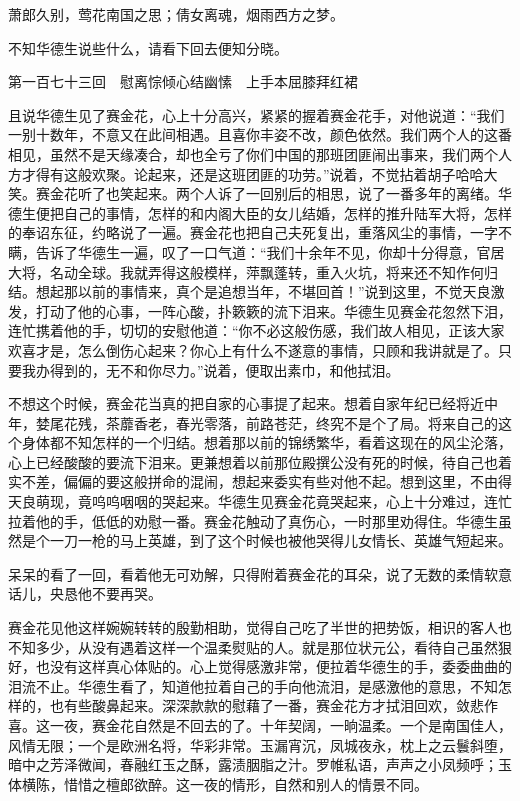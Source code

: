 \documentclass[12pt,UTF8]{ctexbook}
\begin{document}
{{{萧郎久别，莺花南国之思；倩女离魂，烟雨西方之梦。

不知华德生说些什么，请看下回去便知分晓。





第一百七十三回　慰离悰倾心结幽愫　上手本屈膝拜红裙





且说华德生见了赛金花，心上十分高兴，紧紧的握着赛金花手，对他说道：“我们一别十数年，不意又在此间相遇。且喜你丰姿不改，颜色依然。我们两个人的这番相见，虽然不是天缘凑合，却也全亏了你们中国的那班团匪闹出事来，我们两个人方才得有这般欢聚。论起来，还是这班团匪的功劳。”说着，不觉拈着胡子哈哈大笑。赛金花听了也笑起来。两个人诉了一回别后的相思，说了一番多年的离绪。华德生便把自己的事情，怎样的和内阁大臣的女儿结婚，怎样的推升陆军大将，怎样的奉诏东征，约略说了一遍。赛金花也把自己夫死复出，重落风尘的事情，一字不瞒，告诉了华德生一遍，叹了一口气道：“我们十余年不见，你却十分得意，官居大将，名动全球。我就弄得这般模样，萍飘蓬转，重入火坑，将来还不知作何归结。想起那以前的事情来，真个是追想当年，不堪回首！”说到这里，不觉天良激发，打动了他的心事，一阵心酸，扑簌簌的流下泪来。华德生见赛金花忽然下泪，连忙携着他的手，切切的安慰他道：“你不必这般伤感，我们故人相见，正该大家欢喜才是，怎么倒伤心起来？你心上有什么不遂意的事情，只顾和我讲就是了。只要我办得到的，无不和你尽力。”说着，便取出素巾，和他拭泪。

不想这个时候，赛金花当真的把自家的心事提了起来。想着自家年纪已经将近中年，婪尾花残，茶蘼香老，春光零落，前路苍茫，终究不是个了局。将来自己的这个身体都不知怎样的一个归结。想着那以前的锦绣繁华，看着这现在的风尘沦落，心上已经酸酸的要流下泪来。更兼想着以前那位殿撰公没有死的时候，待自己也着实不差，偏偏的要这般拼命的混闹，想起来委实有些对他不起。想到这里，不由得天良萌现，竟呜呜咽咽的哭起来。华德生见赛金花竟哭起来，心上十分难过，连忙拉着他的手，低低的劝慰一番。赛金花触动了真伤心，一时那里劝得住。华德生虽然是个一刀一枪的马上英雄，到了这个时候也被他哭得儿女情长、英雄气短起来。

呆呆的看了一回，看着他无可劝解，只得附着赛金花的耳朵，说了无数的柔情软意话儿，央恳他不要再哭。

赛金花见他这样婉婉转转的殷勤相助，觉得自己吃了半世的把势饭，相识的客人也不知多少，从没有遇着这样一个温柔熨贴的人。就是那位状元公，看待自己虽然狠好，也没有这样真心体贴的。心上觉得感激非常，便拉着华德生的手，委委曲曲的泪流不止。华德生看了，知道他拉着自己的手向他流泪，是感激他的意思，不知怎样的，也有些酸鼻起来。深深款款的慰藉了一番，赛金花方才拭泪回欢，敛悲作喜。这一夜，赛金花自然是不回去的了。十年契阔，一晌温柔。一个是南国佳人，风情无限；一个是欧洲名将，华彩非常。玉漏宵沉，凤城夜永，枕上之云鬟斜堕，暗中之芳泽微闻，春融红玉之酥，露渍胭脂之汁。罗帷私语，声声之小凤频呼；玉体横陈，惜惜之檀郎欲醉。这一夜的情形，自然和别人的情景不同。

}}}
\end{document}

